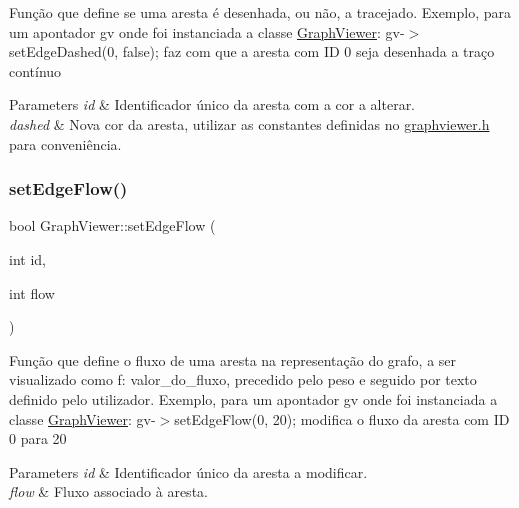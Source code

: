 Função que define se uma aresta é desenhada, ou não, a tracejado. Exemplo, para um apontador gv onde foi instanciada a classe \mbox{\hyperlink{class_graph_viewer}{Graph\+Viewer}}\+: gv-\/$>$set\+Edge\+Dashed(0, false); faz com que a aresta com ID 0 seja desenhada a traço contínuo


\begin{DoxyParams}{Parameters}
{\em id} & Identificador único da aresta com a cor a alterar. \\
\hline
{\em dashed} & Nova cor da aresta, utilizar as constantes definidas no \mbox{\hyperlink{graphviewer_8h}{graphviewer.\+h}} para conveniência. \\
\hline
\end{DoxyParams}
\mbox{\label{class_graph_viewer_a69eb065145063e4dea41961e92e35c8e}} 
\subsubsection{\texorpdfstring{set\+Edge\+Flow()}{setEdgeFlow()}}
{\footnotesize\ttfamily bool Graph\+Viewer\+::set\+Edge\+Flow (\begin{DoxyParamCaption}\item[{int}]{id,  }\item[{int}]{flow }\end{DoxyParamCaption})}

Função que define o fluxo de uma aresta na representação do grafo, a ser visualizado como f\+: valor\+\_\+do\+\_\+fluxo, precedido pelo peso e seguido por texto definido pelo utilizador. Exemplo, para um apontador gv onde foi instanciada a classe \mbox{\hyperlink{class_graph_viewer}{Graph\+Viewer}}\+: gv-\/$>$set\+Edge\+Flow(0, 20); modifica o fluxo da aresta com ID 0 para 20


\begin{DoxyParams}{Parameters}
{\em id} & Identificador único da aresta a modificar. \\
\hline
{\em flow} & Fluxo associado à aresta. \\
\hline
\end{DoxyParams}
\mbox{\label{class_graph_viewer_a447cca0064e785654c2105602c2961ca}} 
